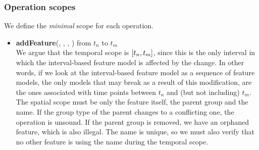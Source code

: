 \subsubsection*{Operation scopes}
We define the \textit{minimal} scope for each operation.
\begin{itemize}

  \item \textbf{addFeature}(, , , ) from $t_n$ to $t_m$\\
     We argue that the temporal scope is $\interval{t_n}{t_m}$, since this is the only interval in which the interval-based feature model is affected by the change. In other words, if we look at the interval-based feature model as a sequence of feature models, the only models that may break as a result of this modification, are the ones associated with time points between $t_n$ and (but not including) $t_m$. The spatial scope must be only the feature itself, the parent group and the name. If the group type of the parent changes to a conflicting one, the operation is unsound. If the parent group is removed, we have an orphaned feature, which is also illegal. The name is unique, so we must also verify that no other feature is using the name during the temporal scope. 
 


\end{itemize}
